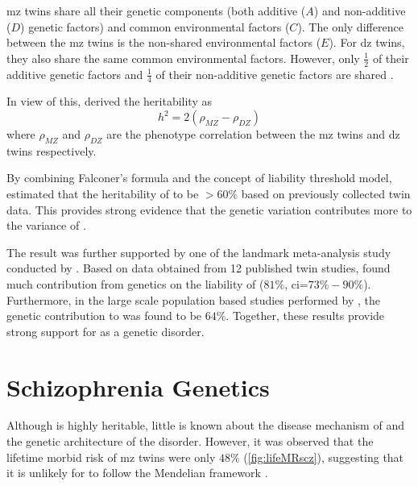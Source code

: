 	\gls{mz} twins share all their genetic components (both additive ($A$) and non-additive ($D$) genetic factors) and common environmental factors ($C$).
	The only difference between the \gls{mz} twins is the non-shared environmental factors ($E$).
	For \gls{dz} twins, they also share the same common environmental factors.
	However, only $\frac{1}{2}$ of their additive genetic factors and $\frac{1}{4}$ of their non-additive genetic factors are shared \citep{Rijsdijk2002}.
	
	In view of this, \cite{Falconer1996} derived the heritability as
	\begin{equation}
	h^2 = 2(\rho_{MZ}-\rho_{DZ})
	\end{equation}
	where $\rho_{MZ}$ and $\rho_{DZ}$ are the phenotype correlation between the \gls{mz} twins and \gls{dz} twins respectively.
	
	By combining Falconer's formula and the concept of liability threshold model, \citet{Gottesman1967} estimated that the heritability of  to be $>60\%$ based on previously collected twin data.
	This provides strong evidence that the genetic variation contributes more to the variance of .
	
	The result was further supported by one of the landmark meta-analysis study conducted by \citet{Sullivan2003}.
	Based on data obtained from 12 published  twin studies, \citet{Sullivan2003} found much contribution from genetics on the liability of  ($81\%$, \gls{ci}=$73\%-90\%$).
	Furthermore, in the large scale population based studies performed by \citet{Lichtenstein2009}, the genetic contribution to  was found to be $64\%$.
	Together, these results provide strong support for  as a genetic disorder. 
	
	\section{Schizophrenia Genetics}
	Although  is highly heritable, little is known about the disease mechanism of  and the genetic architecture of the disorder. 
	However, it was observed that the lifetime morbid risk of \gls{mz} twins were only $48\%$ (\cref{fig:lifeMRscz}), suggesting that it is unlikely for  to follow the Mendelian framework \citep{Gottesman1967,Gottesman1982,gottesman1991schizophrenia}.
	
